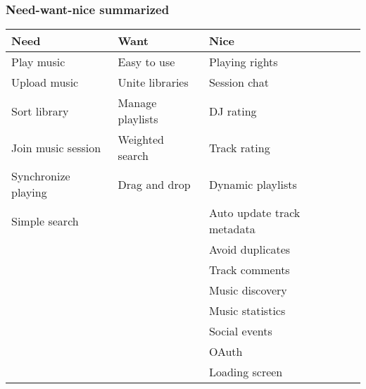 \subsubsection{Need-want-nice summarized}

\begin{center}
	\begin{tabular}{ | l | l | l | p{5cm} |}
	\hline
	\textbf{Need} & \textbf{Want} & \textbf{Nice} \\ \hline
	Play music & Easy to use & Playing rights \\ \hline
	Upload music & Unite libraries & Session chat \\ \hline
	Sort library & Manage playlists & DJ rating \\ \hline
	Join music session & Weighted search & Track rating \\ \hline
	Synchronize playing & Drag and drop& Dynamic playlists \\ \hline
	Simple search & & Auto update track meta\-data \\ \hline
	 & & Avoid duplicates\\ \hline
	 & & Track comments\\ \hline
	 & & Music discovery\\ \hline
	 & & Music statistics\\ \hline
	 & & Social events\\ \hline
	 & & OAuth \\ \hline
	 & & Loading screen\\ \hline
	\end{tabular}
\end{center}